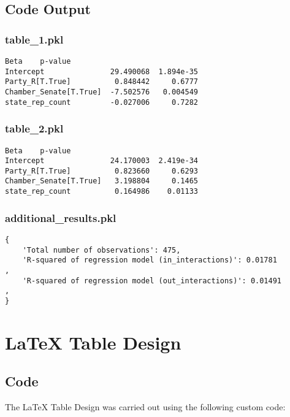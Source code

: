 \documentclass[11pt]{article}
\begin{document}
\subsection{Code Output}

\subsubsection*{table\_1.pkl}

\begin{Verbatim}[tabsize=4]
                             Beta    p-value
Intercept               29.490068  1.894e-35
Party_R[T.True]          0.848442     0.6777
Chamber_Senate[T.True]  -7.502576   0.004549
state_rep_count         -0.027006     0.7282
\end{Verbatim}

\subsubsection*{table\_2.pkl}

\begin{Verbatim}[tabsize=4]
                             Beta    p-value
Intercept               24.170003  2.419e-34
Party_R[T.True]          0.823660     0.6293
Chamber_Senate[T.True]   3.198804     0.1465
state_rep_count          0.164986    0.01133
\end{Verbatim}

\subsubsection*{additional\_results.pkl}

\begin{Verbatim}[tabsize=4]
{
    'Total number of observations': 475,
    'R-squared of regression model (in_interactions)': 0.01781            ,
    'R-squared of regression model (out_interactions)': 0.01491             ,
}
\end{Verbatim}

\section{LaTeX Table Design}
\subsection{{Code}}
The LaTeX Table Design was carried out using the following custom code:
\end{document}
